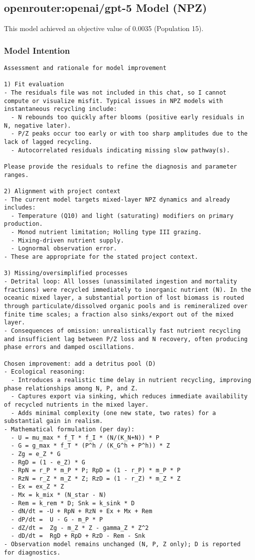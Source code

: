 \subsection{openrouter:openai/gpt-5 Model (NPZ)}
This model achieved an objective value of 0.0035 (Population 15).

\subsubsection{Model Intention}
\begin{lstlisting}
Assessment and rationale for model improvement

1) Fit evaluation
- The residuals file was not included in this chat, so I cannot compute or visualize misfit. Typical issues in NPZ models with instantaneous recycling include:
  - N rebounds too quickly after blooms (positive early residuals in N, negative later).
  - P/Z peaks occur too early or with too sharp amplitudes due to the lack of lagged recycling.
  - Autocorrelated residuals indicating missing slow pathway(s).

Please provide the residuals to refine the diagnosis and parameter ranges.

2) Alignment with project context
- The current model targets mixed-layer NPZ dynamics and already includes:
  - Temperature (Q10) and light (saturating) modifiers on primary production.
  - Monod nutrient limitation; Holling type III grazing.
  - Mixing-driven nutrient supply.
  - Lognormal observation error.
- These are appropriate for the stated project context.

3) Missing/oversimplified processes
- Detrital loop: All losses (unassimilated ingestion and mortality fractions) were recycled immediately to inorganic nutrient (N). In the oceanic mixed layer, a substantial portion of lost biomass is routed through particulate/dissolved organic pools and is remineralized over finite time scales; a fraction also sinks/export out of the mixed layer.
- Consequences of omission: unrealistically fast nutrient recycling and insufficient lag between P/Z loss and N recovery, often producing phase errors and damped oscillations.

Chosen improvement: add a detritus pool (D)
- Ecological reasoning:
  - Introduces a realistic time delay in nutrient recycling, improving phase relationships among N, P, and Z.
  - Captures export via sinking, which reduces immediate availability of recycled nutrients in the mixed layer.
  - Adds minimal complexity (one new state, two rates) for a substantial gain in realism.
- Mathematical formulation (per day):
  - U = mu_max * f_T * f_I * (N/(K_N+N)) * P
  - G = g_max * f_T * (P^h / (K_G^h + P^h)) * Z
  - Zg = e_Z * G
  - RgD = (1 - e_Z) * G
  - RpN = r_P * m_P * P; RpD = (1 - r_P) * m_P * P
  - RzN = r_Z * m_Z * Z; RzD = (1 - r_Z) * m_Z * Z
  - Ex = ex_Z * Z
  - Mx = k_mix * (N_star - N)
  - Rem = k_rem * D; Snk = k_sink * D
  - dN/dt = -U + RpN + RzN + Ex + Mx + Rem
  - dP/dt =  U - G - m_P * P
  - dZ/dt =  Zg - m_Z * Z - gamma_Z * Z^2
  - dD/dt =  RgD + RpD + RzD - Rem - Snk
- Observation model remains unchanged (N, P, Z only); D is reported for diagnostics.


\end{lstlisting}
